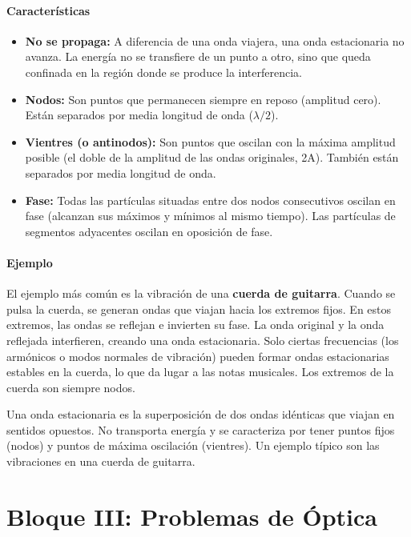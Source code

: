 \paragraph*{Características}
\begin{itemize}
    \item \textbf{No se propaga:} A diferencia de una onda viajera, una onda estacionaria no avanza. La energía no se transfiere de un punto a otro, sino que queda confinada en la región donde se produce la interferencia.
    \item \textbf{Nodos:} Son puntos que permanecen siempre en reposo (amplitud cero). Están separados por media longitud de onda ($\lambda/2$).
    \item \textbf{Vientres (o antinodos):} Son puntos que oscilan con la máxima amplitud posible (el doble de la amplitud de las ondas originales, 2A). También están separados por media longitud de onda.
    \item \textbf{Fase:} Todas las partículas situadas entre dos nodos consecutivos oscilan en fase (alcanzan sus máximos y mínimos al mismo tiempo). Las partículas de segmentos adyacentes oscilan en oposición de fase.
\end{itemize}
\paragraph*{Ejemplo}
El ejemplo más común es la vibración de una \textbf{cuerda de guitarra}. Cuando se pulsa la cuerda, se generan ondas que viajan hacia los extremos fijos. En estos extremos, las ondas se reflejan e invierten su fase. La onda original y la onda reflejada interfieren, creando una onda estacionaria. Solo ciertas frecuencias (los armónicos o modos normales de vibración) pueden formar ondas estacionarias estables en la cuerda, lo que da lugar a las notas musicales. Los extremos de la cuerda son siempre nodos.

\begin{cajaresultado}
Una onda estacionaria es la superposición de dos ondas idénticas que viajan en sentidos opuestos. No transporta energía y se caracteriza por tener puntos fijos (nodos) y puntos de máxima oscilación (vientres). Un ejemplo típico son las vibraciones en una cuerda de guitarra.
\end{cajaresultado}

\newpage

\section{Bloque III: Problemas de Óptica}
\label{sec:optica_2004_jun_ord}

